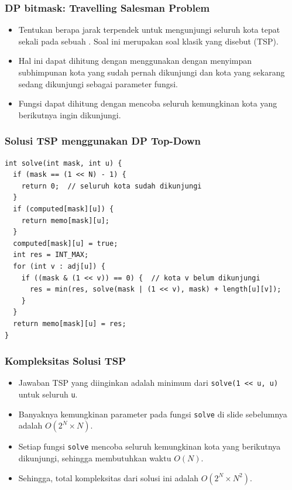 \begin{frame}
\frametitle{DP bitmask: Travelling Salesman Problem}
\begin{itemize}
  \item Tentukan berapa jarak terpendek untuk mengunjungi seluruh kota tepat sekali pada sebuah \fgraph. Soal ini merupakan soal klasik yang disebut  (TSP).
  \item Hal ini dapat dihitung dengan menggunakan \fdp dengan menyimpan subhimpunan kota yang sudah pernah dikunjungi dan kota yang sekarang sedang dikunjungi sebagai parameter fungsi.
  \item Fungsi dapat dihitung dengan mencoba seluruh kemungkinan kota yang berikutnya ingin dikunjungi.
\end{itemize}
\end{frame}

\begin{frame}[fragile]  
\frametitle{Solusi TSP menggunakan DP Top-Down}
\begin{lstlisting}
int solve(int mask, int u) {
  if (mask == (1 << N) - 1) {
    return 0;  // seluruh kota sudah dikunjungi
  }
  if (computed[mask][u]) {
    return memo[mask][u];
  }
  computed[mask][u] = true;
  int res = INT_MAX;
  for (int v : adj[u]) {
    if ((mask & (1 << v)) == 0) {  // kota v belum dikunjungi
      res = min(res, solve(mask | (1 << v), mask) + length[u][v]);
    }
  }
  return memo[mask][u] = res;
}
\end{lstlisting}
\end{frame}

\begin{frame}
\frametitle{Kompleksitas Solusi TSP}
\begin{itemize}
  \item Jawaban TSP yang diinginkan adalah minimum dari \lstinline{solve(1 << u, u)} untuk seluruh \lstinline{u}.
  \item Banyaknya kemungkinan parameter pada fungsi \lstinline{solve} di slide sebelumnya adalah $O(2^N \times N)$.
  \item Setiap fungsi \lstinline{solve} mencoba seluruh kemungkinan kota yang berikutnya dikunjungi, sehingga membutuhkan waktu $O(N)$.
  \item Sehingga, total kompleksitas dari solusi \fdp ini adalah $O(2^N \times N^2)$.
\end{itemize}
\end{frame}

